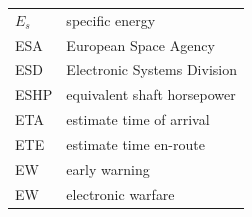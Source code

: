 \documentclass[
]{book}
\begin{document}
\begin{longtable}[]{@{}ll@{}}
\begin{minipage}[t]{0.47\columnwidth}
\(E_s\)\strut
\end{minipage} & \begin{minipage}[t]{0.47\columnwidth}\raggedright
specific energy\strut
\end{minipage}\tabularnewline
\begin{minipage}[t]{0.47\columnwidth}\raggedright
ESA\strut
\end{minipage} & \begin{minipage}[t]{0.47\columnwidth}\raggedright
European Space Agency\strut
\end{minipage}\tabularnewline
\begin{minipage}[t]{0.47\columnwidth}\raggedright
ESD\strut
\end{minipage} & \begin{minipage}[t]{0.47\columnwidth}\raggedright
Electronic Systems Division\strut
\end{minipage}\tabularnewline
\begin{minipage}[t]{0.47\columnwidth}\raggedright
ESHP\strut
\end{minipage} & \begin{minipage}[t]{0.47\columnwidth}\raggedright
equivalent shaft horsepower\strut
\end{minipage}\tabularnewline
\begin{minipage}[t]{0.47\columnwidth}\raggedright
ETA\strut
\end{minipage} & \begin{minipage}[t]{0.47\columnwidth}\raggedright
estimate time of arrival\strut
\end{minipage}\tabularnewline
\begin{minipage}[t]{0.47\columnwidth}\raggedright
ETE\strut
\end{minipage} & \begin{minipage}[t]{0.47\columnwidth}\raggedright
estimate time en-route\strut
\end{minipage}\tabularnewline
\begin{minipage}[t]{0.47\columnwidth}\raggedright
EW\strut
\end{minipage} & \begin{minipage}[t]{0.47\columnwidth}\raggedright
early warning\strut
\end{minipage}\tabularnewline
\begin{minipage}[t]{0.47\columnwidth}\raggedright
EW\strut
\end{minipage} & \begin{minipage}[t]{0.47\columnwidth}\raggedright
electronic warfare\strut

\end{minipage}
\end{longtable}
\end{document}
